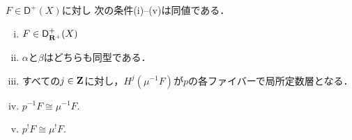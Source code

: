 \begin{leftbar}
\begin{PRP}[{\cite[Proposition 3.7.2]{KS90}}]
    \(F\in\mathsf{D}^{+}(X)\)に対し
    次の条件(i)--(v)は同値である．
    \begin{enumerate}[(i)]
        \item \(F\in \mathsf{D}^{+}_{\mathbf{R}^+}(X)\)
        \item \(\alpha\)と\(\beta\)はどちらも同型である．
        \item すべての\(j\in\mathbf{Z}\)に対し，\(H^j(\mu^{-1}F)\)が\(p\)の各ファイバーで局所定数層となる．
        \item \(p^{-1}F\cong \mu^{-1}F\).
        \item \(p^{!}F\cong \mu^{!}F\).
    \end{enumerate}
\end{PRP}    
\end{leftbar}

